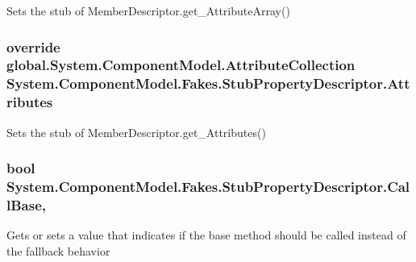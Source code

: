 Sets the stub of Member\-Descriptor.\-get\-\_\-\-Attribute\-Array()

\hypertarget{class_system_1_1_component_model_1_1_fakes_1_1_stub_property_descriptor_a21bcc47ae05a39ca32eb9bc8518d2b00}{
\subsubsection[{Attributes}]{\setlength{\rightskip}{0pt plus 5cm}override global.\-System.\-Component\-Model.\-Attribute\-Collection System.\-Component\-Model.\-Fakes.\-Stub\-Property\-Descriptor.\-Attributes\hspace{0.3cm}{\ttfamily [get]}}}\label{class_system_1_1_component_model_1_1_fakes_1_1_stub_property_descriptor_a21bcc47ae05a39ca32eb9bc8518d2b00}


Sets the stub of Member\-Descriptor.\-get\-\_\-\-Attributes()

\hypertarget{class_system_1_1_component_model_1_1_fakes_1_1_stub_property_descriptor_aa521fae0a88609f188e57839853d924d}{
\subsubsection[{Call\-Base}]{\setlength{\rightskip}{0pt plus 5cm}bool System.\-Component\-Model.\-Fakes.\-Stub\-Property\-Descriptor.\-Call\-Base\hspace{0.3cm}{\ttfamily [get]}, {\ttfamily [set]}}}\label{class_system_1_1_component_model_1_1_fakes_1_1_stub_property_descriptor_aa521fae0a88609f188e57839853d924d}


Gets or sets a value that indicates if the base method should be called instead of the fallback behavior

